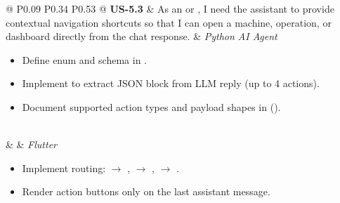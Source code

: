 \begin{longtable}{@{} P{0.09\linewidth} P{0.34\linewidth} P{0.53\linewidth} @{}}
	\textbf{US-5.3}
	& As an  or , I need the assistant
	to provide contextual navigation shortcuts so that I can open a machine,
	operation, or dashboard directly from the chat response.
	& \noindent\textit{Python AI Agent}
	\begin{itemize}[nosep, leftmargin=*]
		\item Define  enum and 
		      schema in .
		\item Implement  to extract
		       JSON block from LLM reply (up to 4 actions).
		\item Document supported action types and payload shapes in
		       ().
	\end{itemize}
\\ & &
	\noindent\textit{Flutter}
	\begin{itemize}[nosep, leftmargin=*]
			\item Implement  routing:
		       $\to$ ,
		       $\to$ ,
		       $\to$ .
		\item Render action buttons only on the last assistant message.
	\end{itemize}\\
	\midrule


\end{longtable}
